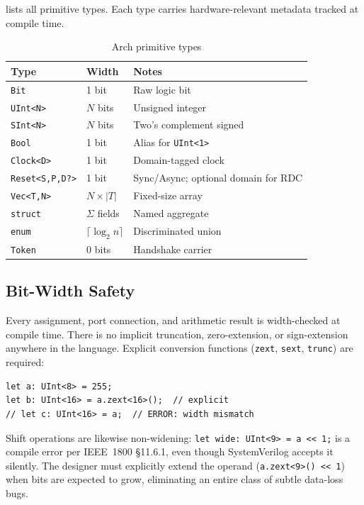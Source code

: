\documentclass[11pt,twocolumn]{article}
\begin{document}
 lists all primitive types. Each type carries hardware-relevant metadata tracked at compile time.

\begin{table}[t]
\centering
\caption{Arch primitive types}
\label{tab:types}
\footnotesize
\begin{tabular}{@{}llp{3.1cm}@{}}
\toprule
\textbf{Type} & \textbf{Width} & \textbf{Notes} \\
\midrule
\texttt{Bit}             & 1 bit & Raw logic bit \\
\texttt{UInt<N>}         & $N$ bits & Unsigned integer \\
\texttt{SInt<N>}         & $N$ bits & Two's complement signed \\
\texttt{Bool}            & 1 bit & Alias for \texttt{UInt<1>} \\
\texttt{Clock<D>}        & 1 bit & Domain-tagged clock \\
\texttt{Reset<S,P,D?>}   & 1 bit & Sync/Async; optional domain for RDC \\
\texttt{Vec<T,N>}        & $N \times |T|$ & Fixed-size array \\
\texttt{struct}          & $\Sigma$ fields & Named aggregate \\
\texttt{enum}            & $\lceil\log_2 n\rceil$ & Discriminated union \\
\texttt{Token}           & 0 bits & Handshake carrier \\
\bottomrule
\end{tabular}
\end{table}

\subsection{Bit-Width Safety}

Every assignment, port connection, and arithmetic result is width-checked at compile time. There is no implicit truncation, zero-extension, or sign-extension anywhere in the language. Explicit conversion functions (\texttt{zext}, \texttt{sext}, \texttt{trunc}) are required:

\begin{lstlisting}[language=Arch,caption={Explicit width conversion},label={lst:width}]
let a: UInt<8> = 255;
let b: UInt<16> = a.zext<16>();  // explicit
// let c: UInt<16> = a;  // ERROR: width mismatch
\end{lstlisting}

Shift operations are likewise non-widening: \texttt{let wide: UInt<9> = a << 1;} is a compile error per IEEE~1800 §11.6.1, even though SystemVerilog accepts it silently. The designer must explicitly extend the operand (\texttt{a.zext<9>() << 1}) when bits are expected to grow, eliminating an entire class of subtle data-loss bugs.
\end{document}
